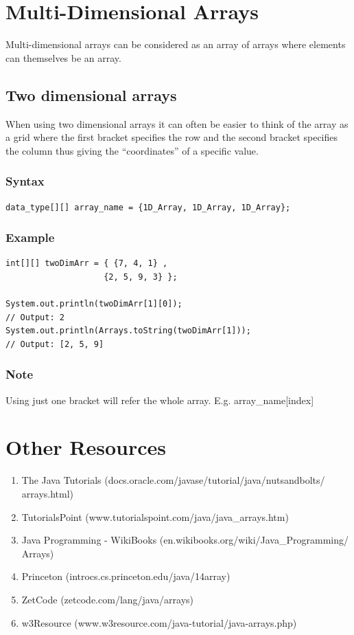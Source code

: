 \documentclass[a4paper]{article}
\begin{document}
\section*{Multi-Dimensional Arrays}
Multi-dimensional arrays can be considered as an array of arrays where elements
can themselves be an array.

\subsection*{Two dimensional arrays}
When using two dimensional arrays it can often be easier to think of the array
as a grid where the first bracket specifies the row and the second bracket
specifies the column thus giving the “coordinates” of a specific value.

\subsubsection*{Syntax}
\begin{lstlisting}
data_type[][] array_name = {1D_Array, 1D_Array, 1D_Array};
\end{lstlisting}

\subsubsection*{Example}
\begin{lstlisting}
int[][] twoDimArr = { {7, 4, 1} ,
    				{2, 5, 9, 3} };

System.out.println(twoDimArr[1][0]);
// Output: 2
System.out.println(Arrays.toString(twoDimArr[1]));
// Output: [2, 5, 9]
\end{lstlisting}

\subsubsection*{Note}
Using just one bracket will refer the whole array. E.g. array\_name[index]


\newpage

\section*{Other Resources}
\begin{enumerate}

\item The Java Tutorials (docs.oracle.com/javase/tutorial/java/nutsandbolts/
arrays.html)

\item TutorialsPoint (www.tutorialspoint.com/java/java\_arrays.htm)

\item Java Programming - WikiBooks (en.wikibooks.org/wiki/Java\_Programming/
Arrays)

\item Princeton (introcs.cs.princeton.edu/java/14array)

\item ZetCode (zetcode.com/lang/java/arrays)

\item w3Resource (www.w3resource.com/java-tutorial/java-arrays.php)

\end{enumerate}
\end{document}
